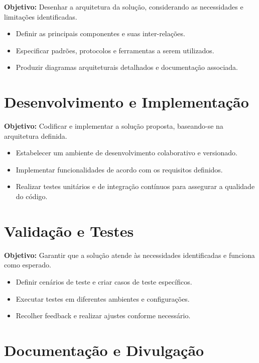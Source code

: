 \textbf{Objetivo:} Desenhar a arquitetura da solução, considerando as necessidades e limitações identificadas.

\begin{itemize}
\item Definir as principais componentes e suas inter-relações.
\item Especificar padrões, protocolos e ferramentas a serem utilizados.
\item Produzir diagramas arquiteturais detalhados e documentação associada.
\end{itemize}

\section{Desenvolvimento e Implementação}

\textbf{Objetivo:} Codificar e implementar a solução proposta, baseando-se na arquitetura definida.

\begin{itemize}
\item Estabelecer um ambiente de desenvolvimento colaborativo e versionado.
\item Implementar funcionalidades de acordo com os requisitos definidos.
\item Realizar testes unitários e de integração contínuos para assegurar a qualidade do código.
\end{itemize}

\section{Validação e Testes}

\textbf{Objetivo:} Garantir que a solução atende às necessidades identificadas e funciona como esperado.

\begin{itemize}
\item Definir cenários de teste e criar casos de teste específicos.
\item Executar testes em diferentes ambientes e configurações.
\item Recolher feedback e realizar ajustes conforme necessário.
\end{itemize}

\section{Documentação e Divulgação}

